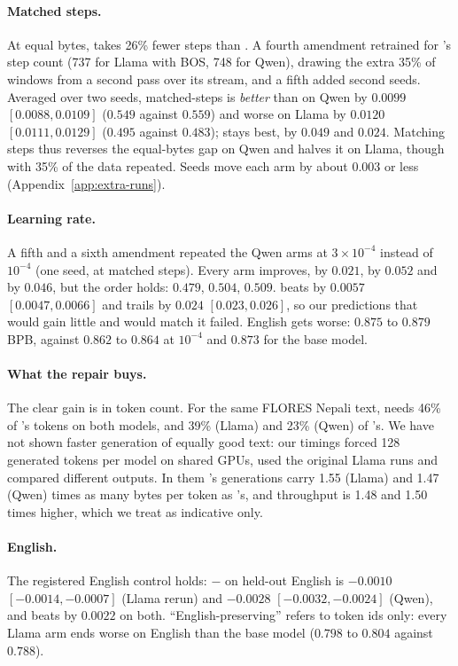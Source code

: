 \paragraph{Matched steps.} At equal bytes, \RII{} takes 26\% fewer steps than \RI{}. A fourth amendment retrained \RII{} for \RI{}'s step count (737 for Llama with BOS, 748 for Qwen), drawing the extra 35\% of windows from a second pass over its stream, and a fifth added second seeds. Averaged over two seeds, matched-steps \RII{} is \emph{better} than \RI{} on Qwen by $0.0099$ $[0.0088, 0.0109]$ ($0.549$ against $0.559$) and worse on Llama by $0.0120$ $[0.0111, 0.0129]$ ($0.495$ against $0.483$); \RO{} stays best, by $0.049$ and $0.024$. Matching steps thus reverses the equal-bytes gap on Qwen and halves it on Llama, though with 35\% of the data repeated. Seeds move each arm by about $0.003$ or less (Appendix~\ref{app:extra-runs}).

\paragraph{Learning rate.} A fifth and a sixth amendment repeated the Qwen arms at $3{\times}10^{-4}$ instead of $10^{-4}$ (one seed, \RII{} at matched steps). Every arm improves, \RO{} by $0.021$, \RI{} by $0.052$ and \RII{} by $0.046$, but the order holds: \RO{} $0.479$, \RII{} $0.504$, \RI{} $0.509$. \RII{} beats \RI{} by $0.0057$ $[0.0047, 0.0066]$ and trails \RO{} by $0.024$ $[0.023, 0.026]$, so our predictions that \RO{} would gain little and \RII{} would match it failed. English gets worse: $0.875$ to $0.879$ BPB, against $0.862$ to $0.864$ at $10^{-4}$ and $0.873$ for the base model.

\paragraph{What the repair buys.} The clear gain is in token count. For the same FLORES Nepali text, \RII{} needs 46\% of \RI{}'s tokens on both models, and 39\% (Llama) and 23\% (Qwen) of \RO{}'s. We have not shown faster generation of equally good text: our timings forced 128 generated tokens per model on shared GPUs, used the original Llama runs and compared different outputs. In them \RII{}'s generations carry 1.55 (Llama) and 1.47 (Qwen) times as many bytes per token as \RI{}'s, and throughput is 1.48 and 1.50 times higher, which we treat as indicative only.

\paragraph{English.} The registered English control holds: \RII{} $-$ \RO{} on held-out English is $-0.0010$ $[-0.0014, -0.0007]$ (Llama rerun) and $-0.0028$ $[-0.0032, -0.0024]$ (Qwen), and \RII{} beats \RI{} by $0.0022$ on both. ``English-preserving'' refers to token ids only: every Llama arm ends worse on English than the base model ($0.798$ to $0.804$ against $0.788$).
